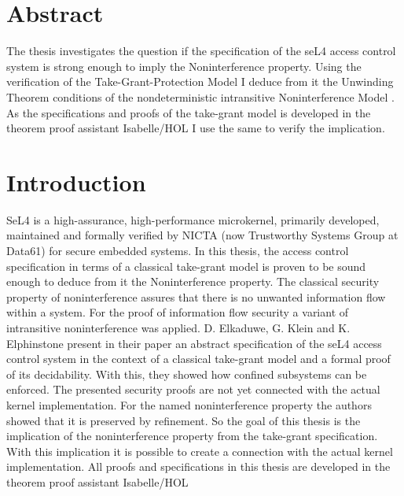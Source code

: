 \documentclass[pdftex,11pt,a4paper]{article}
\begin{document}
	
	\deckblatt
	
	\declaration
	
	\clearpage
	\section*{Abstract}
	
	 The thesis investigates the question if the specification of the seL4 access control system is strong enough to imply the Noninterference property. 
Using the verification of the Take-Grant-Protection Model \cite{TakeG} I deduce from it the Unwinding Theorem conditions of the nondeterministic intransitive Noninterference Model \cite{NonOp}. 
As the specifications and proofs of the take-grant model is developed in the theorem proof assistant Isabelle/HOL I use the same to verify the implication. 
	

	\newpage
	\listoffigures
	\newpage
	\tableofcontents

	
	\clearpage
	\section{Introduction}
	SeL4 is a high-assurance, high-performance microkernel, primarily developed, maintained and formally verified by NICTA (now Trustworthy Systems Group at Data61) for secure embedded systems.
In this thesis, the access control specification in terms of a classical take-grant model is proven to be sound enough to deduce from it the Noninterference property.
The classical security property of noninterference assures that there is no unwanted information flow within a system.
For the proof of information flow security  \cite{NonOp} a variant of intransitive noninterference was applied.
D. Elkaduwe, G. Klein and K. Elphinstone present in their paper \cite{TakeG} an abstract specification of the seL4 access control system in the context of a classical take-grant model and a formal proof of its decidability. With this, they showed how confined subsystems can be enforced.
The presented security proofs are not yet connected with the actual kernel implementation.
For the named noninterference property the authors \cite{NonOp} showed that it is preserved by refinement. So the goal of this thesis is the implication of the noninterference property from the take-grant specification. With this implication it is possible to create a connection with the actual kernel implementation.
All proofs and specifications in this thesis are developed in the theorem proof assistant Isabelle/HOL
\end{document}
